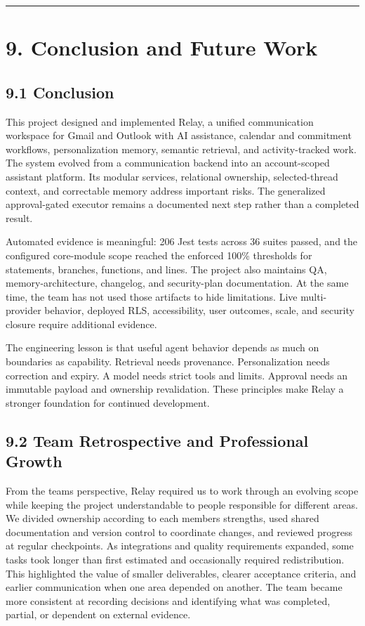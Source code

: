 \documentclass[
]{report}
\begin{document}
\begin{center}\rule{0.5\linewidth}{0.5pt}\end{center}

\chapter{9. Conclusion and Future
Work}\label{9-conclusion-and-future-work}

\section{9.1 Conclusion}\label{91-conclusion}

This project designed and implemented Relay, a unified communication
workspace for Gmail and Outlook with AI assistance, calendar and
commitment workflows, personalization memory, semantic retrieval, and
activity-tracked work. The system evolved from a communication backend
into an account-scoped assistant platform. Its modular services,
relational ownership, selected-thread context, and correctable memory
address important risks. The generalized approval-gated executor remains
a documented next step rather than a completed result.

Automated evidence is meaningful: 206 Jest tests across 36 suites
passed, and the configured core-module scope reached the enforced 100\%
thresholds for statements, branches, functions, and lines. The project
also maintains QA, memory-architecture, changelog, and security-plan
documentation. At the same time, the team has not used those artifacts
to hide limitations. Live multi-provider behavior, deployed RLS,
accessibility, user outcomes, scale, and security closure require
additional evidence.

The engineering lesson is that useful agent behavior depends as much on
boundaries as capability. Retrieval needs provenance. Personalization
needs correction and expiry. A model needs strict tools and limits.
Approval needs an immutable payload and ownership revalidation. These
principles make Relay a stronger foundation for continued development.

\section{9.2 Team Retrospective and Professional
Growth}\label{92-team-retrospective-and-professional-growth}

From the team\textquotesingle s perspective, Relay required us to work
through an evolving scope while keeping the project understandable to
people responsible for different areas. We divided ownership according
to each member\textquotesingle s strengths, used shared documentation
and version control to coordinate changes, and reviewed progress at
regular checkpoints. As integrations and quality requirements expanded,
some tasks took longer than first estimated and occasionally required
redistribution. This highlighted the value of smaller deliverables,
clearer acceptance criteria, and earlier communication when one area
depended on another. The team became more consistent at recording
decisions and identifying what was completed, partial, or dependent on
external evidence.
\end{document}
